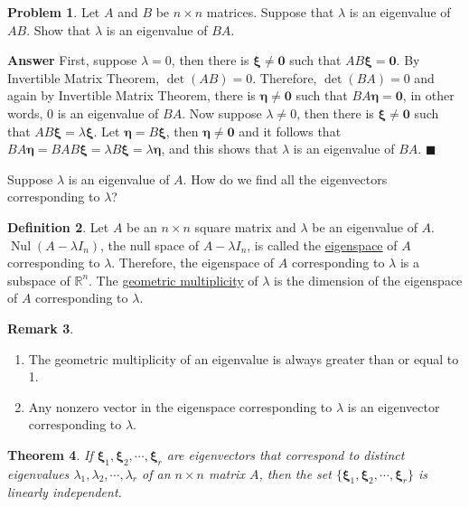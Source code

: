 \documentclass[12pt,letterpaper]{book}
\numberwithin{equation}{section}
\newtheorem{thm}{\textbf{Theorem}}[section]
\theoremstyle{definition}
\newtheorem{defi}[thm]{\textbf{Definition}}
\newtheorem{problem}[thm]{\textbf{Problem}}
\newtheorem{remark}[thm]{\textbf{Remark}}
\newenvironment{answer}{\noindent\textbf{Answer}}{\hfill$\blacksquare$\vspace{0.1in}}
\newcommand{\vxi}{\bm{\xi}}
\newcommand{\veta}{\bm{\eta}}
\newcommand{\veczero}{\bm{0}}
\newcommand{\Nul}{\operatorname{Nul}}
\begin{document}
\begin{problem} \label{ABBA same eigen}
Let $A$ and $B$ be $n\times n$ matrices. Suppose that $\lambda$ is an eigenvalue of $AB$. Show that $\lambda$ is an eigenvalue of $BA$.
\end{problem}

\begin{answer}
First, suppose $\lambda=0$, then there is $\vxi\neq \veczero$ such that $AB\vxi=\veczero$. By Invertible Matrix Theorem, $\det(AB)=0$. Therefore, $\det(BA)=0$ and again by Invertible Matrix Theorem, there is $\veta\neq \veczero$ such that $BA\veta=\veczero$, in other words, $0$ is an eigenvalue of $BA$. Now suppose $\lambda\neq 0$, then there is $\vxi\neq \veczero$ such that $AB\vxi=\lambda\vxi$. Let $\veta=B\vxi$, then $\veta\neq \veczero$ and it follows that $BA\veta=BAB\vxi=\lambda B\vxi=\lambda\veta$, and this shows that $\lambda$ is an eigenvalue of $BA$.
\end{answer}

Suppose $\lambda$ is an eigenvalue of $A$. How do
we find all the eigenvectors corresponding to $\lambda$?

\begin{defi} Let $A$ be an $n\times n$ square matrix and
$\lambda$ be an eigenvalue of $A$. $\Nul (A-\lambda I_n)$, the null space of $A-\lambda I_n$, is called
the \underline{eigenspace} of $A$ corresponding to
$\lambda$. Therefore, the eigenspace of $A$ corresponding to $\lambda$ is a subspace of $\mathbb{R}^n$. The \underline{geometric multiplicity} of
$\lambda$ is the dimension of the eigenspace of $A$ corresponding to $\lambda$.
\end{defi}

\begin{remark}\quad
\begin{enumerate}
\item The geometric multiplicity of an eigenvalue is always greater than or equal to 1.
\item Any nonzero vector in the eigenspace corresponding to $\lambda$ is an eigenvector corresponding to $\lambda$.
\end{enumerate}
\end{remark}

\begin{thm} If $\vxi_1,\vxi_2,\cdots,\vxi_r$ are eigenvectors that
correspond to distinct eigenvalues
$\lambda_1,\lambda_2,\cdots,\lambda_r$ of an $n\times n$ matrix $A$,
then the set $\{\vxi_1,\vxi_2,\cdots,\vxi_r\}$ is linearly
independent.
\end{thm}
\end{document}

